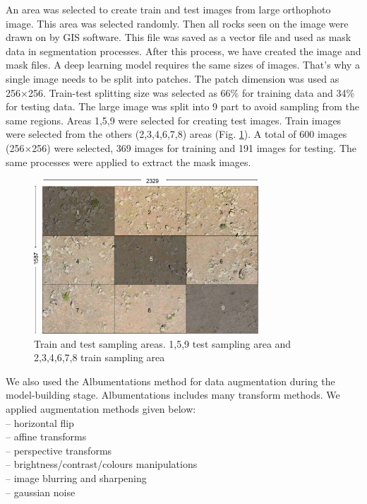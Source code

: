 \documentclass[a4paper,fleqn]{cas-sc}
\begin{document}
An area was selected to create train and test images from large orthophoto image. This area was selected randomly. Then all rocks seen on the image were drawn on by GIS software. This file was saved as a vector file and used as mask data in segmentation processes. After this process, we have created the image and mask files. 
A deep learning model requires the same sizes of images. That's why a single image needs to be split into patches. The patch dimension was used as 256×256. Train-test splitting size was selected as 66\% for training data and 34\% for testing data. The large image was split into 9 part to avoid sampling from the same regions. Areas 1,5,9 were selected for creating test images. Train images were selected from the others (2,3,4,6,7,8) areas (Fig. \ref{fig:Figure4}). A total of 600 images (256×256) were selected, 369 images for training and 191 images for testing. The same processes were applied to extract the mask images.
\begin{figure}
	\centering
	\includegraphics[width=0.75\textwidth]{figures/fig4.jpg}
	\caption{ Train and test sampling areas. 1,5,9 test sampling area and 2,3,4,6,7,8 train sampling area}
	\label{fig:Figure4}
\end{figure}

We also used the Albumentations \citep{buslaev2020albumentations} method for data augmentation during the model-building stage. Albumentations includes many transform methods. We applied augmentation methods given below:\\
– horizontal flip\\
– affine transforms\\
– perspective transforms\\
– brightness/contrast/colours manipulations\\
– image blurring and sharpening\\
– gaussian noise\\
\end{document}
